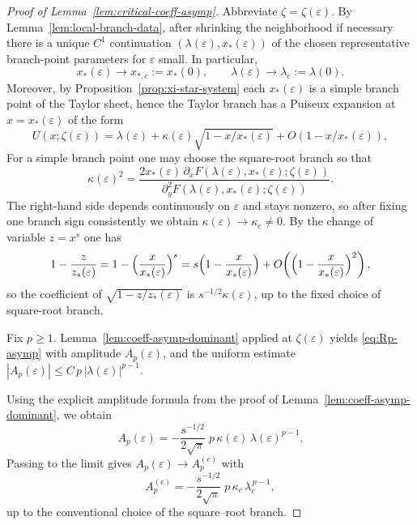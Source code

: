 \documentclass[11pt]{amsart}
\numberwithin{equation}{section}
\theoremstyle{plain}
\theoremstyle{definition}
\theoremstyle{remark}
\begin{document}
\begin{proof}[Proof of Lemma~\ref{lem:critical-coeff-asymp}]
	Abbreviate $\zeta=\zeta(\varepsilon)$. By
	Lemma~\ref{lem:local-branch-data}, after shrinking the neighborhood if
	necessary there is a unique $C^1$ continuation
	$(\lambda(\varepsilon),x_*(\varepsilon))$ of the chosen representative
	branch-point parameters for $\varepsilon$ small.
	In particular,
	\[
		x_*(\varepsilon)\to x_{*,c}:=x_*(0),\qquad \lambda(\varepsilon)\to\lambda_c:=\lambda(0).
	\]
	Moreover, by Proposition~\ref{prop:xi-star-system} each $x_*(\varepsilon)$ is a simple branch point of the Taylor sheet,
	hence the Taylor branch has a Puiseux expansion at $x=x_*(\varepsilon)$ of the form
	\begin{equation}\label{eq:U-local-eps-proof}
		U(x;\zeta(\varepsilon))
		=
		\lambda(\varepsilon)+\kappa(\varepsilon)\sqrt{1-x/x_*(\varepsilon)}
		+O\!\left(1-x/x_*(\varepsilon)\right),
	\end{equation}
	For a simple branch point one may choose the square-root branch so that
	\[
		\kappa(\varepsilon)^2=
		\frac{2x_*(\varepsilon)\,\partial_xF(\lambda(\varepsilon),x_*(\varepsilon);\zeta(\varepsilon))}
		{\partial_y^2F(\lambda(\varepsilon),x_*(\varepsilon);\zeta(\varepsilon))}.
	\]
	The right-hand side depends continuously on $\varepsilon$ and stays nonzero, so after fixing one branch sign
	consistently we obtain $\kappa(\varepsilon)\to\kappa_c\neq0$.
	By the change of variable $z=x^s$ one has
	\[
		1-\frac{z}{z_*(\varepsilon)}
		=
		1-\Bigl(\frac{x}{x_*(\varepsilon)}\Bigr)^s
		=
		s\Bigl(1-\frac{x}{x_*(\varepsilon)}\Bigr)
		+
		O\!\left(\Bigl(1-\frac{x}{x_*(\varepsilon)}\Bigr)^2\right),
	\]
	so the coefficient of $\sqrt{1-z/z_*(\varepsilon)}$ is
	$s^{-1/2}\kappa(\varepsilon)$, up to the fixed choice of square-root branch.

	Fix $p\ge1$. Lemma~\ref{lem:coeff-asymp-dominant} applied at $\zeta(\varepsilon)$ yields
	\eqref{eq:Rp-asymp} with amplitude $A_p(\varepsilon)$, and the uniform estimate
	$|A_p(\varepsilon)|\le C\,p\,|\lambda(\varepsilon)|^{p-1}$.

	Using the explicit amplitude formula from the proof of Lemma~\ref{lem:coeff-asymp-dominant}, we obtain
	\[
		A_p(\varepsilon)
		=
		-\frac{s^{-1/2}}{2\sqrt{\pi}}\;
		p\,\kappa(\varepsilon)\,\lambda(\varepsilon)^{p-1}.
	\]
	Passing to the limit gives $A_p(\varepsilon)\to A_p^{(c)}$ with
	\[
		A_p^{(c)}
		=
		-\frac{s^{-1/2}}{2\sqrt{\pi}}\;
		p\,\kappa_c\,\lambda_c^{\,p-1},
	\]
	up to the conventional choice of the square--root branch.
\end{proof}
\end{document}
